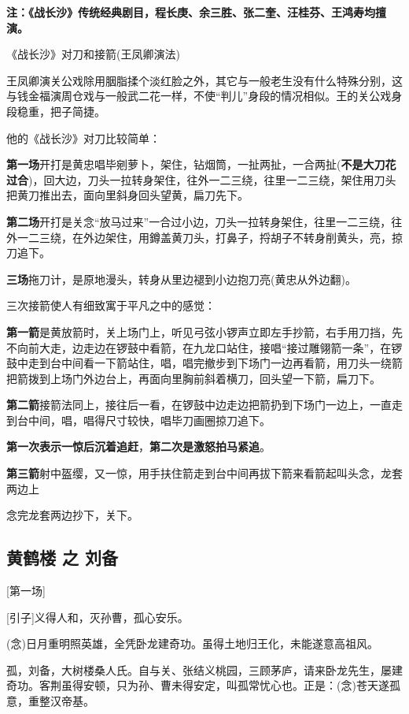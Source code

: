 \textbf{注：《战长沙》传统经典剧目，程长庚、余三胜、张二奎、汪桂芬、王鸿寿均擅演。}

《战长沙》对刀和接箭(王凤卿演法)

王凤卿演关公戏除用胭脂揉个淡红脸之外，其它与一般老生没有什么特殊分别，这与钱金福演周仓戏与一般武二花一样，不使``判儿''身段的情况相似。王的关公戏身段稳重，把子简捷。

他的《战长沙》对刀比较简单：

\textbf{第一场}开打是黄忠唱毕剜萝卜，架住，钻烟筒，一扯两扯，一合两扯(\textbf{不是大刀花过合})，回大边，刀头一拉转身架住，往外一二三绕，往里一二三绕，架住用刀头把黄刀推出去，面向里斜身回头望黄，扁刀先下。

\textbf{第二场}开打是关念``放马过来''一合过小边，刀头一拉转身架住，往里一二三绕，往外一二三绕，在外边架住，用鐏盖黄刀头，打鼻子，捋胡子不转身削黄头，亮，掠刀追下。

\textbf{三场}拖刀计，是原地漫头，转身从里边褪到小边抱刀亮(黄忠从外边翻)。

三次接箭使人有细致寓于平凡之中的感觉：

\textbf{第一箭}是黄放箭时，关上场门上，听见弓弦小锣声立即左手抄箭，右手用刀挡，先不向前大走，边走边在锣鼓中看箭，在九龙口站住，接唱``接过雕翎箭一条''，在锣鼓中走到台中间看一下箭站住，唱，唱完撤步到下场门一边再看箭，用刀头一绕箭把箭拨到上场门外边台上，再面向里胸前斜着横刀，回头望一下箭，扁刀下。

\textbf{第二箭}接箭法同上，接往后一看，在锣鼓中边走边把箭扔到下场门一边上，一直走到台中间，唱，唱得尺寸较快，唱毕刀画圈掠刀追下。

\textbf{第一次表示一惊后沉着追赶}，\textbf{第二次是激怒拍马紧追}。

\textbf{第三箭}射中盔缨，又一惊，用手扶住箭走到台中间再拔下箭来看箭起叫头念，龙套两边上

念完龙套两边抄下，关下。

\hypertarget{ux9ec4ux9e64ux697c-ux4e4b-ux5218ux5907}{%
\subsection{黄鹤楼 之
刘备}\label{ux9ec4ux9e64ux697c-ux4e4b-ux5218ux5907}}

{[}第一场{]}

{[}引子{]}义得人和，灭孙曹，孤心安乐。

(念)日月重明照英雄，全凭卧龙建奇功。虽得土地归王化，未能遂意高祖风。

孤，刘备，大树楼桑人氏。自与关、张结义桃园，三顾茅庐，请来卧龙先生，屡建奇功。客荆虽得安顿，只为孙、曹未得安定，叫孤常忧心也。正是：(念)苍天遂孤意，重整汉帝基。

